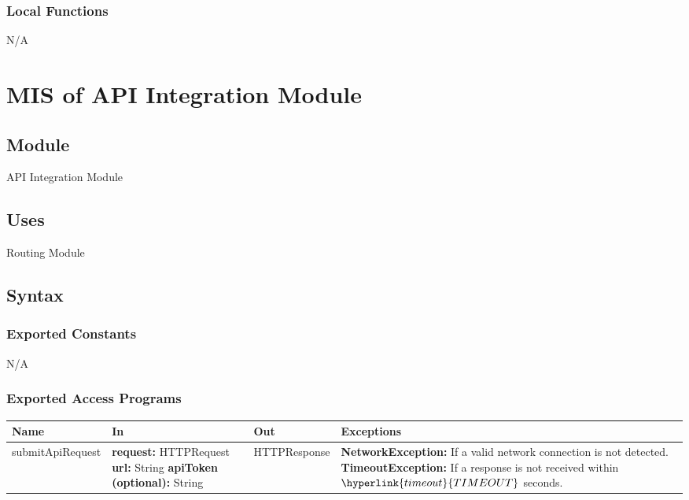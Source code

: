 \documentclass[12pt, titlepage]{article}
\begin{document}
\subsubsection{Local Functions}

N/A

\section{MIS of API Integration Module} \label{Module}

\subsection{Module}
API Integration Module
\subsection{Uses}
Routing Module
\subsection{Syntax}

\subsubsection{Exported Constants}
N/A

\subsubsection{Exported Access Programs}

\begin{center}
  \begin{tabular}{>{\raggedright}p{3cm} >{\raggedright}p{5cm}
    >{\raggedright}p{4cm} p{4cm}}
    \hline
    \textbf{Name} & \textbf{In} & \textbf{Out} & \textbf{Exceptions} \\
    \hline
    submitApiRequest & \textbf{request:} HTTPRequest
    \newline \textbf{url:} String \newline \textbf{apiToken
    (optional):} String & HTTPResponse &
    \textbf{NetworkException:} If a valid network connection is not detected.
    \newline \textbf{TimeoutException:} If a response is not received within
    $\hyperlink{timeout}{TIMEOUT}$ seconds.\\
    \hline
  \end{tabular}
\end{center}
\end{document}
